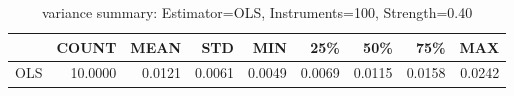 \begin{table}[ht]
\centering
\caption{variance summary: Estimator=OLS, Instruments=100, Strength=0.40}
\begin{tabular}{lrrrrrrrr}
\toprule
 & COUNT & MEAN & STD & MIN & 25\% & 50\% & 75\% & MAX \\
\midrule
OLS & 10.0000 & 0.0121 & 0.0061 & 0.0049 & 0.0069 & 0.0115 & 0.0158 & 0.0242 \\
\bottomrule
\end{tabular}
\end{table}
